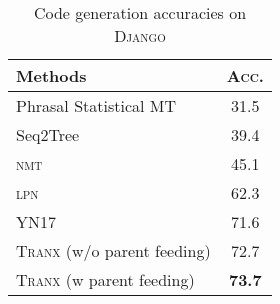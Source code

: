 \documentclass[11pt,a4paper]{article}
\def\model/{\textsc{Tranx}}
\def\django/{\textsc{Django}}
\def\sq/{{\sc Seq2Tree}}
\begin{document}
\begin{table}[tb]
\small
  \centering
  \begin{tabular}{lc}
  \hline

  \hline
  \textbf{Methods} & \textsc{Acc.}  \\
  \hline
    Phrasal Statistical MT~\citep{DBLP:conf/acl/LingBGHKWS16} & 31.5 \\
    \sq/~\citep{DBLP:conf/acl/DongL16} &  39.4 \\
    \textsc{nmt}~\citep{neubig15lamtram} & 45.1 \\
    \textsc{lpn}~\citep{DBLP:conf/acl/LingBGHKWS16} & 62.3 \\
    YN17~\citep{yin17acl} & 71.6 \\ \hline
    \model/ (w/o parent feeding) & 72.7 \\
    \model/ (w parent feeding)   & \textbf{73.7} \\
  \hline

  \hline
  \end{tabular}
  \caption{Code generation accuracies on \django/}
  \label{tab:exp:resuts:django}
  \vspace{-4mm}
\end{table}
\end{document}
